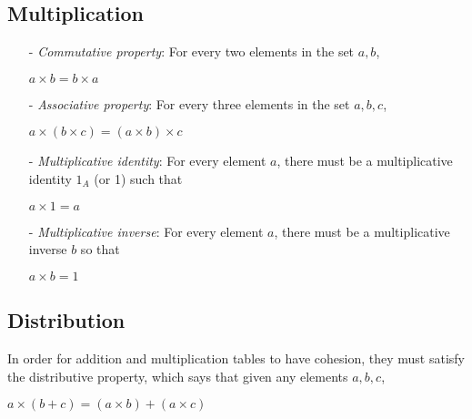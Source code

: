 \documentclass{article}
\begin{document}
\subsection{Multiplication}
\begin{itemize}
    \item[-] \textit{Commutative property}: For every two elements in the set $a, b$,
    \begin{center}
        $a \times b = b \times a$
    \end{center} 
    
    \item[-] \textit{Associative property}: For every three elements in the set $a, b, c$,
    \begin{center}
        $a \times (b \times c) = (a \times b) \times c$
    \end{center}

    \item[-] \textit{Multiplicative identity}: For every element $a$, there must be a multiplicative identity $1_A$ (or 1) such that
    \begin{center}
        $a \times 1 = a$
    \end{center}

    \item[-] \textit{Multiplicative inverse}: For every element $a$, there must be a multiplicative inverse $b$ so that
    \begin{center}
        $a \times b = 1$
    \end{center}
\end{itemize}

\subsection{Distribution}
In order for addition and multiplication tables to have cohesion, they must satisfy the distributive property, which says that given any elements $a, b, c$,
\begin{center}
    $a \times (b + c) = (a \times b) + (a \times c)$
\end{center}
\end{document}
